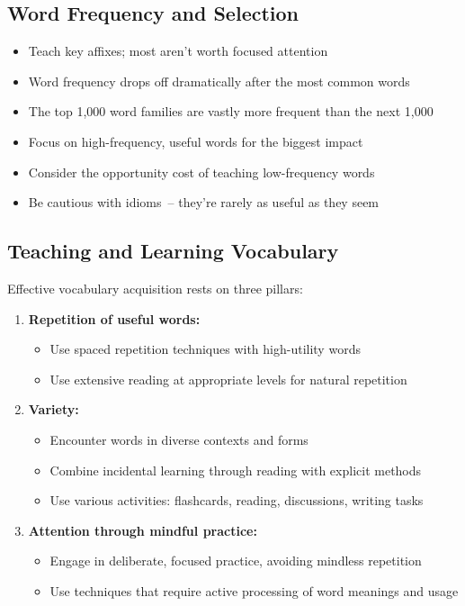 \subsection*{Word Frequency and Selection}

\begin{itemize}

\item Teach key affixes; most aren't worth focused attention
\item Word frequency drops off dramatically after the most common words
\item The top 1,000 word families are vastly more frequent than the next 1,000
\item Focus on high-frequency, useful words for the biggest impact
\item Consider the opportunity cost of teaching low-frequency words
\item Be cautious with idioms~-- they're rarely as useful as they seem
\end{itemize}

\subsection*{Teaching and Learning Vocabulary}

Effective vocabulary acquisition rests on three pillars:

\begin{enumerate}
\item \textbf{Repetition of useful words:}
    \begin{itemize}
    \item Use spaced repetition techniques with high-utility words
    \item Use extensive reading at appropriate levels for natural repetition
    \end{itemize}

\item \textbf{Variety:}
    \begin{itemize}
    \item Encounter words in diverse contexts and forms
    \item Combine incidental learning through reading with explicit methods
    \item Use various activities: flashcards, reading, discussions, writing tasks
    \end{itemize}

\item \textbf{Attention through mindful practice:}
    \begin{itemize}
    \item Engage in deliberate, focused practice, avoiding mindless repetition
    \item Use techniques that require active processing of word meanings and usage
    \end{itemize}
\end{enumerate}

